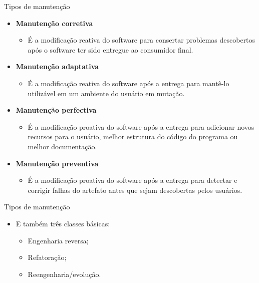 \documentclass{beamer}
\begin{document}
\begin{frame}{Tipos de manutenção}
	\begin{itemize}
		\justifying
		\item<1> \textbf{Manutenção corretiva}
			\begin{itemize}
				\justifying
				\item<1> É a modificação reativa do software para consertar problemas descobertos após o software ter sido entregue ao consumidor final.
			\end{itemize}
		\item<2> \textbf{Manutenção adaptativa}
			\begin{itemize}
				\justifying
				\item<2> É a modificação reativa do software após a entrega para mantê-lo utilizável em um ambiente do usuário em mutação.
			\end{itemize}
		\item<3> \textbf{Manutenção perfectiva}
			\begin{itemize}
				\justifying
				\item<3> É a modificação proativa do software após a entrega para adicionar novos recursos para o usuário, melhor estrutura do código do programa ou melhor documentação.
			\end{itemize}
		\item<4> \textbf{Manutenção preventiva}
			\begin{itemize}
				\item<4> É a modificação proativa do software após a entrega para detectar e corrigir falhas do artefato antes que sejam descobertas pelos usuários.
			\end{itemize}
	\end{itemize}
\end{frame}

\begin{frame}{Tipos de manutenção}
	\begin{itemize}
		\justifying
		\item E também três classes básicas:
			\begin{itemize}
				\item Engenharia reversa;
				\item Refatoração;
				\item Reengenharia/evolução.
			\end{itemize}
	\end{itemize}
\end{frame}

\end{document}
